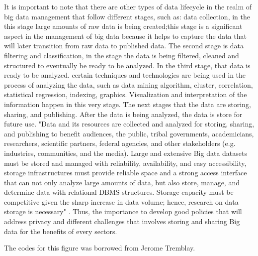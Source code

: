 \documentclass[sigconf]{acmart}
\begin{document}
It is important to note that there are other types of data lifecycle in the realm of big data management that follow different stages, such as: data collection, in the this stage large amounts of raw data is being created;this stage is a significant aspect in the management of big data because it helps to capture the data that will later transition from raw data to published data. The second stage is data filtering and classification, in the stage the data is being filtered, cleaned and structured to eventually be ready to be analyzed. In the third stage, that data is ready to be analyzed. certain techniques and technologies are being used in the process of analyzing the data, such as data mining algorithm, cluster, correlation, statistical regression, indexing, graphics. Visualization and interpretation of the information happen in this very stage. The next stages that the data are storing, sharing, and publishing. After the data is being analyzed, the data is store for future use. "Data and its resources are collected and analyzed for storing, sharing, and publishing to benefit audiences, the public, tribal governments, academicians, researchers, scientific partners, federal agencies, and other stakeholders (e.g. industries, communities, and the media). Large and extensive Big data datasets must be stored and managed with reliability, availability, and easy accessibility, storage infrastructures must provide reliable space and a strong access interface that can not only analyze large amounts of data, but also store, manage, and determine data with relational DBMS structures. Storage capacity must be competitive given the sharp increase in data volume; hence, research on data storage is necessary" \cite{khan2014big}. Thus, the importance to develop good policies that will address privacy and different challenges that involves storing and sharing Big data for the benefits of every sectors. 

The codes for this figure was borrowed from Jerome Tremblay.


\end{document}
